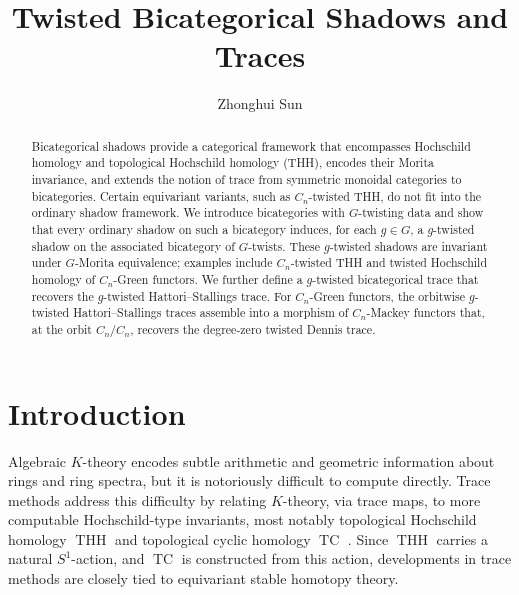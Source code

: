 \documentclass[11pt,oneside]{amsart}
\DeclareMathOperator{\THH}{THH}
\DeclareMathOperator{\TC}{TC}
\numberwithin{equation}{section}
\numberwithin{figure}{section}
\theoremstyle{plain}
\theoremstyle{definition}
\theoremstyle{remark}
\begin{document}
 



\title{Twisted Bicategorical Shadows and Traces}
\author{Zhonghui Sun}
\address{Michigan State University}




\begin{abstract}
Bicategorical shadows provide a categorical framework that encompasses Hochschild homology and topological Hochschild homology (THH), encodes their Morita invariance, and extends the notion of trace from symmetric monoidal categories to bicategories. Certain equivariant variants, such as \(C_n\)-twisted THH, do not fit into the ordinary shadow framework. We introduce bicategories with \(G\)-twisting data and show that every ordinary shadow on such a bicategory induces, for each \(g\in G\), a \(g\)-twisted shadow on the associated bicategory of \(G\)-twists. These \(g\)-twisted shadows are invariant under \(G\)-Morita equivalence; examples include \(C_n\)-twisted THH and twisted Hochschild homology of \(C_n\)-Green functors. We further define a \(g\)-twisted bicategorical trace that recovers the \(g\)-twisted Hattori--Stallings trace. For \(C_n\)-Green functors, the orbitwise \(g\)-twisted Hattori--Stallings traces assemble into a morphism of \(C_n\)-Mackey functors that, at the orbit \(C_n/C_n\), recovers the degree-zero twisted Dennis trace.
\end{abstract}

\maketitle


 



\tableofcontents
{}
\setcounter{page}{1}

\section{Introduction}
Algebraic \(K\)-theory encodes subtle arithmetic and geometric information about rings and ring spectra, but it is notoriously difficult to compute directly. Trace methods address this difficulty by relating $K$-theory, via trace maps, to more computable Hochschild-type invariants, most notably topological Hochschild homology \(\THH\) and topological cyclic homology \(\TC\) \cite{BHM, NikolausScholze}. Since \(\THH\) carries a natural \(S^1\)-action, and \(\TC\) is constructed from this action, developments in trace methods are closely tied to equivariant stable homotopy theory.
\end{document}
